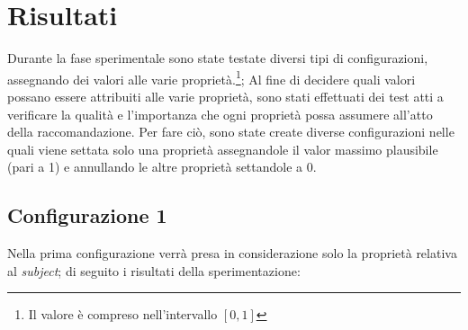 \section{Risultati}
Durante la fase sperimentale sono state testate diversi tipi di configurazioni, assegnando dei valori alle varie proprietà.\footnote{Il valore è compreso nell'intervallo $[0,1]$}; 
Al fine di decidere quali valori possano essere attribuiti alle varie proprietà, sono stati effettuati dei test atti a verificare la qualità e l'importanza che ogni proprietà possa assumere all'atto della raccomandazione. Per fare ciò, sono state create diverse configurazioni nelle quali viene settata solo una proprietà assegnandole il valor massimo plausibile (pari a 1) e annullando le altre proprietà settandole a 0.

\subsection{Configurazione 1}
Nella prima configurazione verrà presa in considerazione solo la proprietà relativa al \emph{subject}; di seguito i risultati della sperimentazione:

